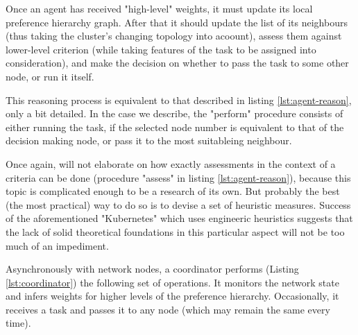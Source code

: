 Once an agent has received "high-level" weights, it must update its local preference hierarchy graph.
After that it should update the list of its neighbours (thus taking the cluster's changing topology into acoount), assess them against lower-level criterion (while taking features of the task to be assigned into consideration), and make the decision on whether to pass the task to some other node, or run it itself.

This reasoning process is equivalent to that described in listing \ref{lst:agent-reason}, only a bit detailed.
In the case we describe, the "perform" procedure consists of either running the task, if the selected node number is equivalent to that of the decision making node, or pass it to the most suitableing neighbour.

Once again, will not elaborate on how exactly assessments in the context of a criteria can be done (procedure "assess" in listing \ref{lst:agent-reason}), because this topic is complicated enough to be a research of its own.
But probably the best (the most practical) way to do so is to devise a set of heuristic measures.
Success of the aforementioned "Kubernetes" which uses engineeric heuristics suggests that the lack of solid theoretical foundations in this particular aspect will not be too much of an impediment.

Asynchronously with network nodes, a coordinator performs (Listing \ref{lst:coordinator}) the following set of operations.
It monitors the network state and infers weights for higher levels of the preference hierarchy.
Occasionally, it receives a task and passes it to any node (which may remain the same every time).
